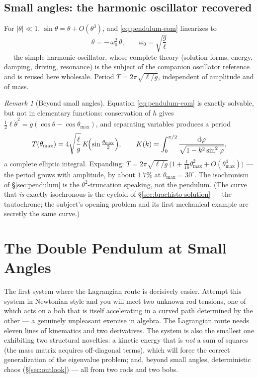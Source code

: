 \documentclass[11pt]{article}
\theoremstyle{plain}
\theoremstyle{definition}
\theoremstyle{remark}
\newtheorem{remark}[theorem]{Remark}
\newcommand{\dd}{\mathrm{d}}
\begin{document}
\subsection{Small angles: the harmonic oscillator recovered}

For $|\theta| \ll 1$, $\sin\theta = \theta + O(\theta^3)$, and
\eqref{eq:pendulum-eom} linearizes to
\begin{equation}
  \ddot\theta = -\,\omega_0^2\,\theta,
  \qquad
  \omega_0 = \sqrt{\frac{g}{\ell}}
\end{equation}
--- the simple harmonic oscillator, whose complete theory (solution
forms, energy, damping, driving, resonance) is the subject of the
companion oscillator reference and is reused here wholesale. Period
$T = 2\pi\sqrt{\ell/g}$, independent of amplitude and of mass.

\begin{remark}[Beyond small angles]\label{rem:exact-pendulum}
Equation \eqref{eq:pendulum-eom} is exactly solvable, but not in
elementary functions: conservation of $h$ gives
$\tfrac12\ell\dot\theta^2 = g(\cos\theta - \cos\theta_{\max})$, and
separating variables produces a period
\begin{equation}
  T(\theta_{\max})
  = 4\sqrt{\frac{\ell}{g}}\,K\!\Bigl(\sin\tfrac{\theta_{\max}}{2}\Bigr),
  \qquad
  K(k) = \int_0^{\pi/2}\frac{\dd\varphi}{\sqrt{1 - k^2\sin^2\varphi}} ,
\end{equation}
a complete elliptic integral. Expanding:
$T = 2\pi\sqrt{\ell/g}\,\bigl(1 + \tfrac{1}{16}\theta_{\max}^2 +
O(\theta_{\max}^4)\bigr)$ --- the period grows with amplitude, by about
$1.7\%$ at $\theta_{\max} = 30^\circ$. The isochronism of
\S\ref{sec:pendulum} is the $\theta^2$-truncation speaking, not the
pendulum. (The curve that \emph{is} exactly isochronous is the cycloid of
\S\ref{sec:brachisto-solution} --- the tautochrone; the subject's opening
problem and its first mechanical example are secretly the same curve.)
\end{remark}

\section{The Double Pendulum at Small Angles}
\label{sec:double-pendulum}

The first system where the Lagrangian route is decisively easier.
Attempt this system
in Newtonian style and you will meet two unknown rod tensions, one of
which acts on a bob that is itself accelerating in a curved path
determined by the other --- a genuinely unpleasant exercise in algebra.
The Lagrangian route needs eleven lines of kinematics and two derivatives.
The system is also the smallest one exhibiting two structural novelties:
a kinetic energy that is \emph{not} a sum of squares (the mass matrix
acquires off-diagonal terms), which will force the correct
generalization
of the eigenvalue problem; and, beyond small angles, deterministic chaos
(\S\ref{sec:outlook}) --- all from two rods and two bobs.
\end{document}
